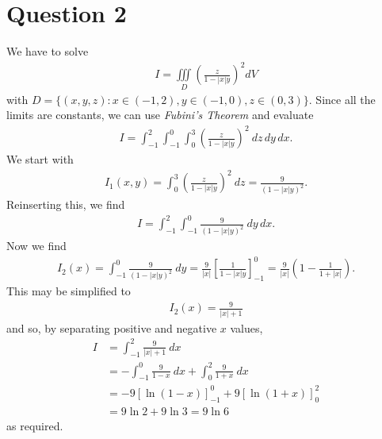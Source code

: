 \documentclass{article}
\newcommand{\ti}{\iiint\limits}
\begin{document}
\section*{Question 2}
We have to solve
\begin{align*}
  I = \ti_D \left(\frac{z}{1-|x|y}\right)^2 dV
\end{align*}
with $D=\{(x,y,z) : x\in(-1,2), y\in(-1,0), z\in(0,3)\}$. Since all the limits are constants,
we can use \emph{Fubini's Theorem} and evaluate
\begin{align*}
  I = \int_{-1}^2 \int_{-1}^0 \int_0^3 \left(\frac{z}{1-|x|y}\right)^2\:dz\,dy\,dx. 
\end{align*}
We start with
\begin{align*}
  I_1 (x,y) = \int_0^3 \left(\frac{z}{1-|x|y}\right)^2\:dz = \frac{9}{(1-|x|y)^2}.
\end{align*}
Reinserting this, we find
\begin{align*}
  I = \int_{-1}^2 \int_{-1}^0 \frac{9}{(1-|x|y)^2}\:dy\,dx.
\end{align*}
Now we find
\begin{align*}
  I_2 (x) = \int_{-1}^0 \frac{9}{(1-|x|y)^2}\:dy 
  = \frac{9}{|x|}\left[\frac{1}{1-|x|y}\right]_{-1}^0
  = \frac{9}{|x|}\left(1-\frac{1}{1+|x|}\right).
\end{align*}
This may be simplified to
\begin{align*}
  I_2(x)=\frac{9}{|x|+1}
\end{align*}
and so, by separating positive and negative $x$ values, 
\begin{align*}
  I &= \int_{-1}^2 \frac{9}{|x|+1}\: dx\\
  &=-\int_{-1}^0 \frac{9}{1-x}\:dx
  + \int_0^2 \frac{9}{1+x}\: dx\\
  &=-9\left[\ln(1-x)\right]_{-1}^0 + 9\left[\ln(1+x)\right]_0^2\\
  &=9\ln 2 + 9\ln 3 = 9\ln 6
\end{align*} 
as required.
\end{document}
